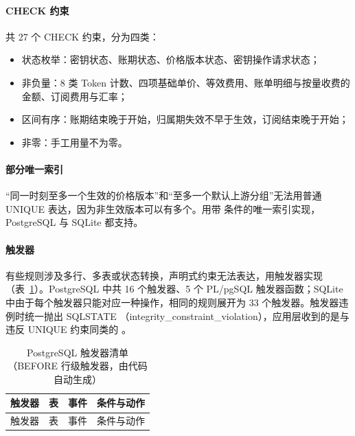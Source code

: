 \paragraph{CHECK 约束}
共 27 个 CHECK 约束，分为四类：
\begin{itemize}
  \item 状态枚举：密钥状态、账期状态、价格版本状态、密钥操作请求状态；
  \item 非负量：8 类 Token 计数、四项基础单价、等效费用、账单明细与按量收费的金额、订阅费用与汇率；
  \item 区间有序：账期结束晚于开始，归属期失效不早于生效，订阅结束晚于开始；
  \item 非零：手工用量不为零。
\end{itemize}

\paragraph{部分唯一索引}
“同一时刻至多一个生效的价格版本”和“至多一个默认上游分组”无法用普通 UNIQUE 表达，因为非生效版本可以有多个。用带  条件的唯一索引实现，PostgreSQL 与 SQLite 都支持。

\paragraph{触发器}
有些规则涉及多行、多表或状态转换，声明式约束无法表达，用触发器实现（表~\ref{tab:triggers}）。PostgreSQL 中共 16 个触发器、5 个 PL/pgSQL 触发器函数；SQLite 中由于每个触发器只能对应一种操作，相同的规则展开为 33 个触发器。触发器违例时统一抛出 SQLSTATE （integrity\_constraint\_violation），应用层收到的是与违反 UNIQUE 约束同类的 。

{\small
\begin{longtable}{@{}p{}p{}p{}p{}@{}}
\caption{PostgreSQL 触发器清单（BEFORE 行级触发器，由代码自动生成）}\label{tab:triggers}\\
\toprule 触发器 & 表 & 事件 & 条件与动作 \\ \midrule\endfirsthead
\toprule 触发器 & 表 & 事件 & 条件与动作 \\ \midrule\endhead

\end{longtable}
}

